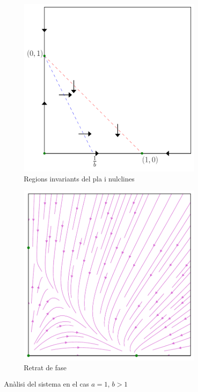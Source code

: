 \documentclass[12pt]{article}
\numberwithin{table}{section}
\numberwithin{equation}{section}
\numberwithin{figure}{section}
\begin{document}
\begin{figure}
	\centering
	\begin{subfigure}[htb]{0.48\textwidth}
		\centering
		\includegraphics[width=\textwidth]{retrat-5a.pdf}
		\caption{Regions invariants del pla i nulclines}
		\label{fig:retrat 5a}
	\end{subfigure}
	\begin{subfigure}[htb]{0.48\textwidth}
		\centering
		\includegraphics[width=\textwidth]{retrat-5b.pdf}
		\caption{Retrat de fase}
		\label{fig:retrat 5b}
	\end{subfigure}
	\caption{Anàlisi del sistema en el cas \( a = 1 \), \( b > 1 \)}
	\label{fig:retrat 5}
\end{figure}
\end{document}
